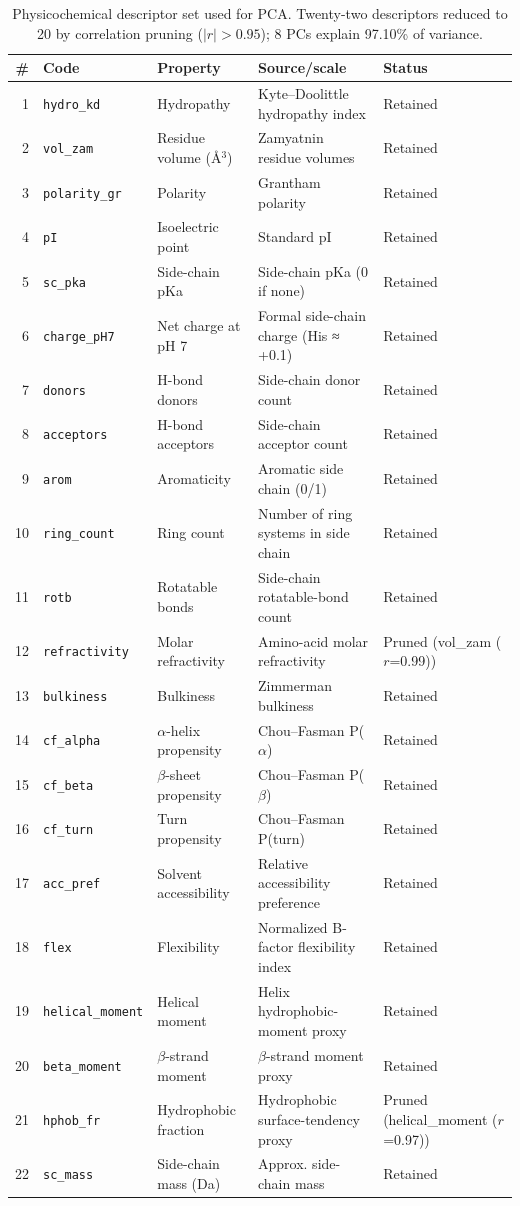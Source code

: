 \begin{table}[htbp]
\centering
\caption{Physicochemical descriptor set used for PCA. Twenty-two descriptors reduced to 20 by correlation pruning ($|r|>0.95$); 8 PCs explain 97.10\% of variance.}
\label{tab:S2}
\small
\begin{tabular}{r l l l l}
\hline
\# & Code & Property & Source/scale & Status \\
\hline
1 & \texttt{hydro\_kd} & Hydropathy & Kyte--Doolittle hydropathy index & Retained \\
2 & \texttt{vol\_zam} & Residue volume (\AA{}$^3$) & Zamyatnin residue volumes & Retained \\
3 & \texttt{polarity\_gr} & Polarity & Grantham polarity & Retained \\
4 & \texttt{pI} & Isoelectric point & Standard pI & Retained \\
5 & \texttt{sc\_pka} & Side-chain pKa & Side-chain pKa (0 if none) & Retained \\
6 & \texttt{charge\_pH7} & Net charge at pH 7 & Formal side-chain charge (His ≈ +0.1) & Retained \\
7 & \texttt{donors} & H-bond donors & Side-chain donor count & Retained \\
8 & \texttt{acceptors} & H-bond acceptors & Side-chain acceptor count & Retained \\
9 & \texttt{arom} & Aromaticity & Aromatic side chain (0/1) & Retained \\
10 & \texttt{ring\_count} & Ring count & Number of ring systems in side chain & Retained \\
11 & \texttt{rotb} & Rotatable bonds & Side-chain rotatable-bond count & Retained \\
12 & \texttt{refractivity} & Molar refractivity & Amino-acid molar refractivity & Pruned (vol_zam ($r$=0.99)) \\
13 & \texttt{bulkiness} & Bulkiness & Zimmerman bulkiness & Retained \\
14 & \texttt{cf\_alpha} & $\alpha$-helix propensity & Chou--Fasman P($\alpha$) & Retained \\
15 & \texttt{cf\_beta} & $\beta$-sheet propensity & Chou--Fasman P($\beta$) & Retained \\
16 & \texttt{cf\_turn} & Turn propensity & Chou--Fasman P(turn) & Retained \\
17 & \texttt{acc\_pref} & Solvent accessibility & Relative accessibility preference & Retained \\
18 & \texttt{flex} & Flexibility & Normalized B-factor flexibility index & Retained \\
19 & \texttt{helical\_moment} & Helical moment & Helix hydrophobic-moment proxy & Retained \\
20 & \texttt{beta\_moment} & $\beta$-strand moment & $\beta$-strand moment proxy & Retained \\
21 & \texttt{hphob\_fr} & Hydrophobic fraction & Hydrophobic surface-tendency proxy & Pruned (helical_moment ($r$=0.97)) \\
22 & \texttt{sc\_mass} & Side-chain mass (Da) & Approx. side-chain mass & Retained \\
\hline
\end{tabular}
\end{table}